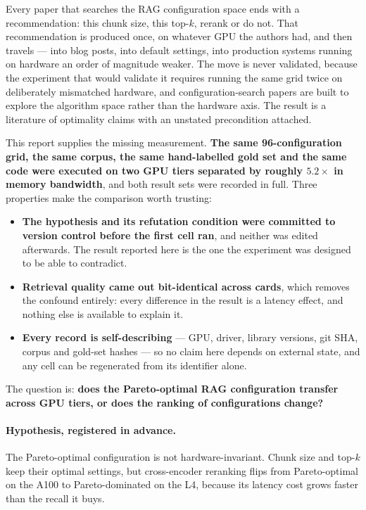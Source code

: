Every paper that searches the RAG configuration space ends with a
recommendation: this chunk size, this top-$k$, rerank or do not. That
recommendation is produced once, on whatever GPU the authors had, and then
travels --- into blog posts, into default settings, into production systems
running on hardware an order of magnitude weaker. The move is never validated,
because the experiment that would validate it requires running the same grid
twice on deliberately mismatched hardware, and configuration-search papers are
built to explore the algorithm space rather than the hardware axis. The result
is a literature of optimality claims with an unstated precondition attached.

This report supplies the missing measurement. \textbf{The same 96-configuration
grid, the same corpus, the same hand-labelled gold set and the same code were
executed on two GPU tiers separated by roughly $5.2\times$ in memory
bandwidth}, and both result sets were recorded in full. Three properties make
the comparison worth trusting:

\begin{itemize}\itemsep2pt
  \item \textbf{The hypothesis and its refutation condition were committed to
        version control before the first cell ran}, and neither was edited
        afterwards. The result reported here is the one the experiment was
        designed to be able to contradict.
  \item \textbf{Retrieval quality came out bit-identical across cards}, which
        removes the confound entirely: every difference in the result is a
        latency effect, and nothing else is available to explain it.
  \item \textbf{Every record is self-describing} --- GPU, driver, library
        versions, git SHA, corpus and gold-set hashes --- so no claim here
        depends on external state, and any cell can be regenerated from its
        identifier alone.
\end{itemize}

The question is: \textbf{does the Pareto-optimal RAG configuration transfer
across GPU tiers, or does the ranking of configurations change?}

\paragraph{Hypothesis, registered in advance.}
The Pareto-optimal configuration is not hardware-invariant. Chunk size and
top-$k$ keep their optimal settings, but cross-encoder reranking flips from
Pareto-optimal on the A100 to Pareto-dominated on the L4, because its latency
cost grows faster than the recall it buys.

